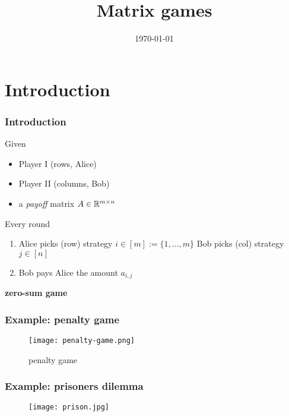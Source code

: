 \documentclass{beamer}
\title{Matrix games}
\date{\today}
\begin{document}
\maketitle
\frame{\tableofcontents[currentsection]}

\section{Introduction}%

\begin{frame}
  \frametitle{Introduction}
  Given
  \begin{itemize}
    \item Player I (rows, Alice)
          \item Player II (columns, Bob)
          \item a \emph{payoff} matrix $A \in \mathbb{R}^{m \times n}$
  \end{itemize}
  Every round
  \begin{enumerate}
    \item Alice picks (row) strategy $i\in [m]:= \{1,\dots, m\}$
          Bob picks (col) strategy $j\in [n]$
    \item Bob pays Alice the amount $a_{i,j}$
  \end{enumerate}
  \begin{center}
    \textbf{zero-sum game}
  \end{center}
\end{frame}

\begin{frame}
  \frametitle{Example: penalty game}
  \begin{figure}[ht]
    \centering
    \texttt{[image: penalty-game.png]}
    \caption{penalty game}
  \end{figure}
\end{frame}

\begin{frame}
  \frametitle{Example: prisoners dilemma}
  \begin{figure}[ht]
    \centering
    \texttt{[image: prison.jpg]}
    \caption{\label{fig:label} }
  \end{figure}
\end{frame}
\end{document}
